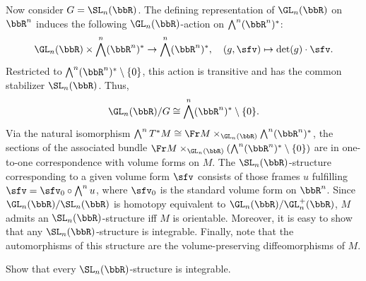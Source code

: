 \begin{example}
    Now consider $G=\SL_n(\bbR)$. The defining representation of $\GL_n(\bbR)$ on $\bbR^n$ induces the following $\GL_n(\bbR)$-action on $\bigwedge^n(\bbR^n)^\ast$: 
    \[\GL_n(\bbR)\times \bigwedge^n(\bbR^n)^\ast\to  \bigwedge^n(\bbR^n)^\ast,\quad (g,\sfv)\mapsto \det(g)\cdot\sfv.\]
    Restricted to $\bigwedge^n(\bbR^n)^\ast\setminus\{0\}$, this action is transitive and has the common stabilizer $\SL_n(\bbR)$. Thus, 
    \[\GL_n(\bbR)\slash G\cong \bigwedge^n(\bbR^n)^\ast\setminus\{0\}.\]
    Via the natural isomorphism $\bigwedge^n T^\ast M\cong \Fr M\times_{\GL_n(\bbR)}\bigwedge^n(\bbR^n)^\ast$, the sections of the associated bundle $\Fr M\times_{\GL_n(\bbR)} \left(\bigwedge^n(\bbR^n)^\ast\setminus\{0\}\right)$ are in one-to-one correspondence with volume forms on $M$. The $\SL_n(\bbR)$-structure corresponding to a given volume form $\sfv$ consists of those frames $u$ fulfilling $\sfv=\sfv_0\circ \bigwedge^n u$, where $\sfv_0$ is the standard volume form on $\bbR^n$. Since $\GL_n(\bbR)\slash\SL_n(\bbR)$ is homotopy equivalent to $\GL_n(\bbR)\slash \GL_n^+(\bbR)$, $M$ admits an $\SL_n(\bbR)$-structure iff $M$ is orientable. Moreover, it is easy to show that any $\SL_n(\bbR)$-structure is integrable. Finally, note that the automorphisms of this structure are the volume-preserving diffeomorphisms of $M$.
\end{example}
\begin{xca}
    Show that every $\SL_n(\bbR)$-structure is integrable.
\end{xca}

